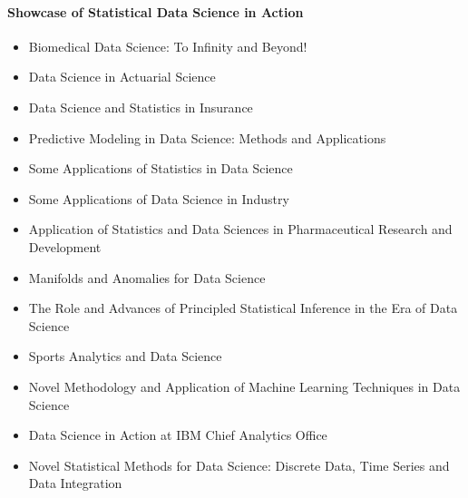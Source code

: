 \documentclass[12pt]{article}
\begin{document}
\paragraph{Showcase of Statistical Data Science in Action}
\begin{itemize}
\item
  Biomedical Data Science: To Infinity and Beyond!

\item
  Data Science in Actuarial Science

\item
  Data Science and Statistics in Insurance

\item
  Predictive Modeling in Data Science: Methods and Applications

\item
  Some Applications of Statistics in Data Science

\item
  Some Applications of Data Science in Industry

\item
  Application of Statistics and Data Sciences in Pharmaceutical
  Research and Development

\item
  Manifolds and Anomalies for Data Science

\item
  The Role and Advances of Principled Statistical Inference in the Era
  of Data Science

\item
  Sports Analytics and Data Science

\item
  Novel Methodology and Application of Machine Learning Techniques in
  Data Science

\item
  Data Science in Action at IBM Chief Analytics Office

\item
  Novel Statistical Methods for Data Science: Discrete Data, Time
  Series and Data Integration


\end{itemize}
\end{document}
